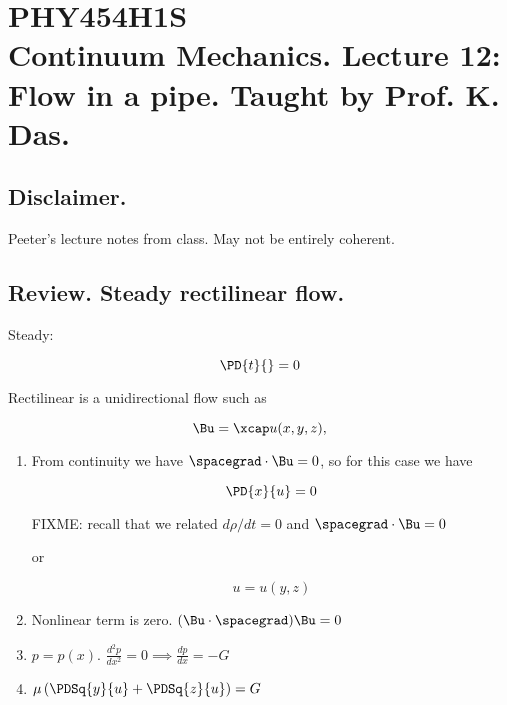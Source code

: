 
%

\chapter{PHY454H1S\\Continuum Mechanics.  Lecture 12: Flow in a pipe.  Taught by Prof. K. Das.}
\label{chap:continuumL12}
{}
\date{Feb 12, 2012}

\beginArtWithToc

\section{Disclaimer.}

Peeter's lecture notes from class.  May not be entirely coherent.

\section{Review.  Steady rectilinear flow.}

Steady:

\begin{equation}\label{eqn:continuumL12:10}
\PD{t}{} = 0
\end{equation}

Rectilinear is a unidirectional flow such as

\begin{equation}\label{eqn:continuumL12:30}
\Bu = \xcap u( x, y, z ),
\end{equation}

\begin{enumerate}
\item 
From continuity we have $\spacegrad \cdot \Bu = 0$, so for this case we have

\begin{equation*}
\PD{x}{u} = 0
\end{equation*}

FIXME: recall that we related $d\rho/dt = 0$ and $\spacegrad \cdot \Bu = 0$

or 

\begin{equation*}
u = u(y, z)
\end{equation*}

\item Nonlinear term is zero.  $(\Bu \cdot \spacegrad) \Bu = 0$
\item $p = p(x)$.  $\frac{d^2 p}{dx^2} = 0 \implies \frac{dp}{dx} = -G$

\item $\mu \left( \PDSq{y}{u} + \PDSq{z}{u} \right) = G$

\end{enumerate}

